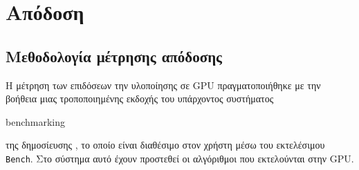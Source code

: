 \DefineShortVerb{\!}
\chapter{Απόδοση}
\section{Μεθοδολογία μέτρησης απόδοσης}
\label{chapter:bench_method}
\noindent
Η μέτρηση των επιδόσεων την υλοποίησης σε GPU πραγματοποιήθηκε με την βοήθεια μιας τροποποιημένης εκδοχής του υπάρχοντος συστήματος \begin{english}benchmarking\end{english} της δημοσίευσης \cite{PlatisTheoharis03}, το οποίο είναι διαθέσιμο στον χρήστη μέσω του εκτελέσιμου \verb!Bench!. Στο σύστημα αυτό έχουν προστεθεί οι αλγόριθμοι που εκτελούνται στην GPU.

